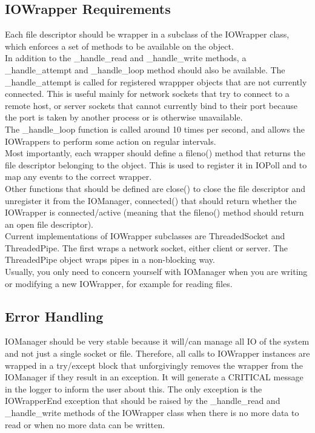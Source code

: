 \documentclass[a4paper, 10pt, oneside]{article}
\begin{document}
\subsection{IOWrapper Requirements}
Each file descriptor should be wrapper in a subclass of the IOWrapper class,
which enforces a set of methods to be available on the object.\\

In addition to the \_handle\_read and \_handle\_write methods, a
\_handle\_attempt and \_handle\_loop method should also be available. The
\_handle\_attempt is called for registered wrappper objects that are not
currently connected. This is useful mainly for network sockets that try to
connect to a remote host, or server sockets that cannot currently bind to their
port because the port is taken by another process or is otherwise unavailable.\\

The \_handle\_loop function is called around 10 times per second, and allows the
IOWrappers to perform some action on regular intervals.\\

Most importantly, each wrapper should define a fileno() method that returns the
file descriptor belonging to the object. This is used to register it in IOPoll
and to map any events to the correct wrapper.\\

Other functions that should be defined are close() to close the file descriptor
and unregister it from the IOManager, connected() that should return whether the
IOWrapper is connected/active (meaning that the fileno() method should return an
open file descriptor).\\

Current implementations of IOWrapper subclasses are ThreadedSocket and
ThreadedPipe. The first wraps a network socket, either client or server.  The
ThreadedPipe object wraps pipes in a non-blocking way.\\

Usually, you only need to concern yourself with IOManager when you are writing
or modifying a new IOWrapper, for example for reading files.

\subsection{Error Handling}
IOManager should be very stable because it will/can manage all IO of the system
and not just a single socket or file. Therefore, all calls to IOWrapper
instances are wrapped in a try/except block that unforgivingly removes the
wrapper from the IOManager if they result in an exception. It will generate a
CRITICAL message in the logger to inform the user about this. The only exception
is the IOWrapperEnd exception that should be raised by the \_handle\_read and
\_handle\_write methods of the IOWrapper class when there is no more data to read
or when no more data can be written.\\
\end{document}
